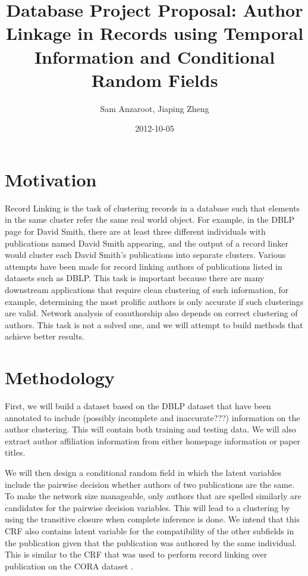 \documentclass[]{article}
\title{Database Project Proposal: Author Linkage in Records using Temporal Information and Conditional Random Fields}
\author{Sam Anzaroot, Jiaping Zheng}
\date{2012-10-05}
\begin{document}
\ifpdf
{}
\else
{}
\fi

\maketitle

\section{Motivation} %
\label{sec:motivation}
Record Linking is the task of clustering records in a database such that elements in the same cluster refer the same real world object. For example, in the DBLP page for David Smith, there are at least three different individuals with publications named David Smith appearing, and the output of a record linker would cluster each David Smith's publications into separate clusters. Various attempts have been made for record linking authors of publications listed in datasets such as DBLP. This task is important because there are many downstream applications that require clean clustering of such information, for example, determining the most prolific authors is only accurate if such clusterings are valid. Network analysis of coauthorship also depends on correct clustering of authors. This task is not a solved one, and we will attempt to build methods that achieve better results.

\section{Methodology} %
\label{sec:methodology}
First, we will build a dataset based on the DBLP dataset that have been annotated to include ({\color{red}possibly incomplete and inaccurate???}) information on the author clustering. This will contain both training and testing data. We will also extract author affiliation information from either homepage information or paper titles.

We will then design a conditional random field in which the latent variables include the pairwise decision whether authors of two publications are the same. To make the network size manageable, only authors that are spelled similarly are candidates for the pairwise decision variables. This will lead to a clustering by using the transitive closure when complete inference is done. We intend that this CRF also contains latent variable for the compatibility of the other subfields in the publication given that the publication was authored by the same individual. This is similar to the CRF that was used to perform record linking over publication on the CORA dataset \cite{Domingos04multi}.
\end{document}
